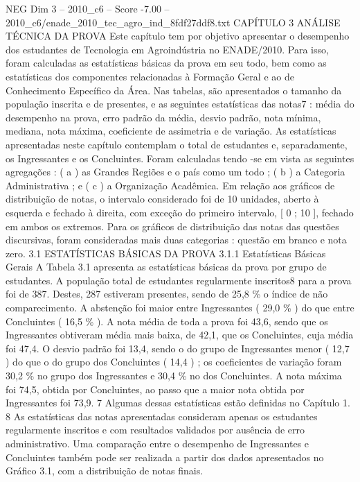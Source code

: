 \begin{textsample}{NEG Dim 3 – 2010\_c6 – Score -7.00 – 2010\_c6/enade\_2010\_tec\_agro\_ind\_8fdf27ddf8.txt}  \label{ex:f3_neg_012}
CAPÍTULO 3 ANÁLISE TÉCNICA DA PROVA Este capítulo tem por objetivo apresentar o desempenho dos estudantes de Tecnologia em Agroindústria no ENADE/2010.
Para isso, foram calculadas as estatísticas básicas da prova em seu todo, bem como as estatísticas dos componentes relacionadas à Formação Geral e ao de Conhecimento Específico da Área.
Nas tabelas, são apresentados o tamanho da população inscrita e de presentes, e as seguintes estatísticas das notas7 : média do desempenho na prova, erro padrão da média, desvio padrão, nota mínima, mediana, nota máxima, coeficiente de assimetria e de variação.
As estatísticas apresentadas neste capítulo contemplam o total de estudantes e, separadamente, os Ingressantes e os Concluintes.
Foram calculadas tendo -se em vista as seguintes agregações : ( a ) as Grandes Regiões e o país como um todo ; ( b ) a Categoria Administrativa ; e ( c ) a Organização Acadêmica.
Em relação aos gráficos de distribuição de notas, o intervalo considerado foi de 10 unidades, aberto à esquerda e fechado à direita, com exceção do primeiro intervalo, [ 0 ; 10 ], fechado em ambos os extremos.
Para os gráficos de distribuição das notas das questões discursivas, foram consideradas mais duas categorias : questão em branco e nota zero. 3.1 ESTATÍSTICAS BÁSICAS DA PROVA 3.1.1 Estatísticas Básicas Gerais A Tabela 3.1 apresenta as estatísticas básicas da prova por grupo de estudantes.
A população total de estudantes regularmente inscritos8 para a prova foi de 387.
Destes, 287 estiveram presentes, sendo de 25,8 \% o índice de não comparecimento.
A abstenção foi maior entre Ingressantes ( 29,0 \% ) do que entre Concluintes ( 16,5 \% ).
A nota média de toda a prova foi 43,6, sendo que os Ingressantes obtiveram média mais baixa, de 42,1, que os Concluintes, cuja média foi 47,4.
O desvio padrão foi 13,4, sendo o do grupo de Ingressantes menor ( 12,7 ) do que o do grupo dos Concluintes ( 14,4 ) ; os coeficientes de variação foram 30,2 \% no grupo dos Ingressantes e 30,4 \% no dos Concluintes.
A nota máxima foi 74,5, obtida por Concluintes, ao passo que a maior nota obtida por Ingressantes foi 73,9. 7 Algumas dessas estatísticas estão definidas no Capítulo 1. 8 As estatísticas das notas apresentadas consideram apenas os estudantes regularmente inscritos e com resultados validados por ausência de erro administrativo.
Uma comparação entre o desempenho de Ingressantes e Concluintes também pode ser realizada a partir dos dados apresentados no Gráfico 3.1, com a distribuição de notas finais.

\end{textsample}
